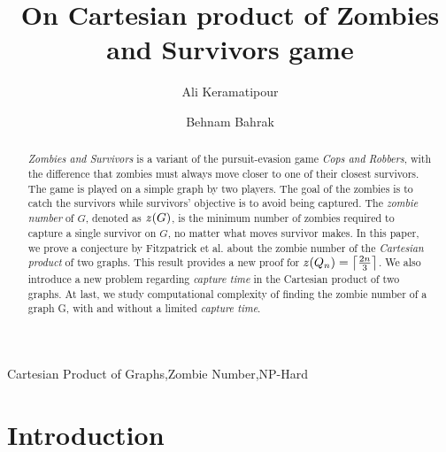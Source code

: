 \documentclass[1p]{elsarticle}
\DeclarePairedDelimiter\ceil{\lceil}{\rceil} \DeclarePairedDelimiter\floor{\lfloor}{\rfloor}
\newcommand{\zn}{\ooalign{$z$\cr\hfil\rule[.5ex]{.2em}{.08ex}\hfil\cr}}
\begin{document}
	
	\begin{frontmatter}
		
		\title{On Cartesian product of Zombies and Survivors game}
		
		
		\author{Ali Keramatipour}
		
		\author{Behnam Bahrak}
		
		\address{School of Electrical and Computer Engineering, College of Engineering, University of Tehran, Tehran, Iran}
		
		\begin{abstract}
		{\it Zombies and Survivors} is a variant of the pursuit-evasion game {\it Cops and Robbers}, with the difference
		that zombies must always move closer to one of their closest survivors. The game is played on a simple graph by
		two players. The goal of the zombies is to catch the survivors while survivors' objective is to avoid being
		captured. The {\it zombie number} of $G$, denoted as $\zn(G)$, is the minimum number of zombies required to
		capture a single survivor on $G$, no matter what moves survivor makes. In this paper, we prove a conjecture by
		Fitzpatrick et al.\cite{Fitz16} about the zombie number of the {\it Cartesian product} of two graphs. This
		result provides a new proof for $\zn(Q_n) = \ceil*{\frac{2n}{3}}$. We also introduce a new problem regarding
		{\it capture time} in the Cartesian product of two graphs. At last, we study computational complexity of finding the
		zombie number of a graph G, with and without a limited {\it capture time}.
		\end{abstract}
		
		\begin{keyword}
			Cartesian Product of Graphs\sep Zombie Number\sep NP-Hard
		\end{keyword}
		
	\end{frontmatter}
	
\section{Introduction}\label{section-introduction}
\end{document}
